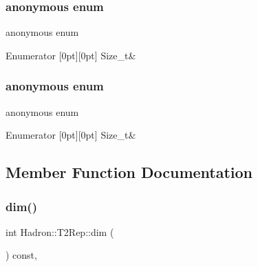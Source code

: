 \subsubsection{\texorpdfstring{anonymous enum}{anonymous enum}}
{\footnotesize\ttfamily anonymous enum}

\begin{DoxyEnumFields}{Enumerator}
[0pt][0pt]{}\mbox{\label{structHadron_1_1T2Rep_a14ecc2efafdd4f5ab6800549b8687616a660115eb304ba1dbc8ce3ac7a7aa05c9}} 
Size\+\_\+t&\\
\hline

\end{DoxyEnumFields}
\mbox{\label{structHadron_1_1T2Rep_a1ea95bd561a0c01375638f5214d67059}} 
\subsubsection{\texorpdfstring{anonymous enum}{anonymous enum}}
{\footnotesize\ttfamily anonymous enum}

\begin{DoxyEnumFields}{Enumerator}
[0pt][0pt]{}\mbox{\label{structHadron_1_1T2Rep_a14ecc2efafdd4f5ab6800549b8687616a660115eb304ba1dbc8ce3ac7a7aa05c9}} 
Size\+\_\+t&\\
\hline

\end{DoxyEnumFields}


\subsection{Member Function Documentation}
\mbox{\label{structHadron_1_1T2Rep_a06553069af895fb049a99d50612cba44}} 
\subsubsection{\texorpdfstring{dim()}{dim()}\hspace{0.1cm}{\footnotesize\ttfamily [1/3]}}
{\footnotesize\ttfamily int Hadron\+::\+T2\+Rep\+::dim (\begin{DoxyParamCaption}{ }\end{DoxyParamCaption}) const\hspace{0.3cm}{\ttfamily [inline]}, {\ttfamily [virtual]}}



